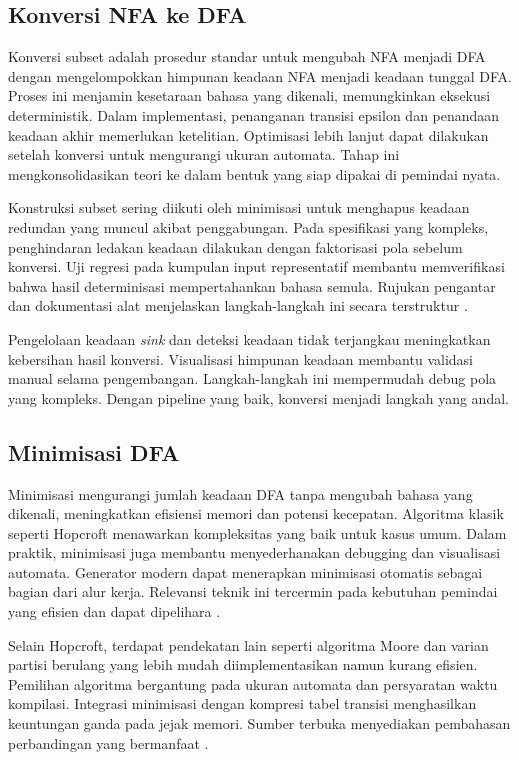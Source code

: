 \documentclass[../main.tex]{subfiles}
\begin{document}
\subsection{Konversi NFA ke DFA}
Konversi subset adalah prosedur standar untuk mengubah NFA menjadi DFA dengan mengelompokkan himpunan keadaan NFA menjadi keadaan tunggal DFA. Proses ini menjamin kesetaraan bahasa yang dikenali, memungkinkan eksekusi deterministik. Dalam implementasi, penanganan transisi epsilon dan penandaan keadaan akhir memerlukan ketelitian. Optimisasi lebih lanjut dapat dilakukan setelah konversi untuk mengurangi ukuran automata. Tahap ini mengkonsolidasikan teori ke dalam bentuk yang siap dipakai di pemindai nyata.

Konstruksi subset sering diikuti oleh minimisasi untuk menghapus keadaan redundan yang muncul akibat penggabungan. Pada spesifikasi yang kompleks, penghindaran ledakan keadaan dilakukan dengan faktorisasi pola sebelum konversi. Uji regresi pada kumpulan input representatif membantu memverifikasi bahwa hasil determinisasi mempertahankan bahasa semula. Rujukan pengantar dan dokumentasi alat menjelaskan langkah-langkah ini secara terstruktur \citep{WikiNFA,WikiDFA}.

Pengelolaan keadaan \emph{sink} dan deteksi keadaan tidak terjangkau meningkatkan kebersihan hasil konversi. Visualisasi himpunan keadaan membantu validasi manual selama pengembangan. Langkah-langkah ini mempermudah debug pola yang kompleks. Dengan pipeline yang baik, konversi menjadi langkah yang andal.

\subsection{Minimisasi DFA}
Minimisasi mengurangi jumlah keadaan DFA tanpa mengubah bahasa yang dikenali, meningkatkan efisiensi memori dan potensi kecepatan. Algoritma klasik seperti Hopcroft menawarkan kompleksitas yang baik untuk kasus umum. Dalam praktik, minimisasi juga membantu menyederhanakan debugging dan visualisasi automata. Generator modern dapat menerapkan minimisasi otomatis sebagai bagian dari alur kerja. Relevansi teknik ini tercermin pada kebutuhan pemindai yang efisien dan dapat dipelihara \citep{WikiDFAMin}.

Selain Hopcroft, terdapat pendekatan lain seperti algoritma Moore dan varian partisi berulang yang lebih mudah diimplementasikan namun kurang efisien. Pemilihan algoritma bergantung pada ukuran automata dan persyaratan waktu kompilasi. Integrasi minimisasi dengan kompresi tabel transisi menghasilkan keuntungan ganda pada jejak memori. Sumber terbuka menyediakan pembahasan perbandingan yang bermanfaat \citep{WikiDFAMin,Mogensen2010}.
\end{document}
